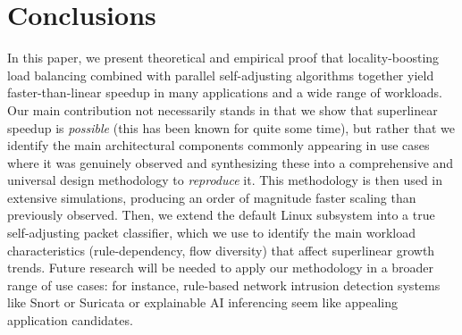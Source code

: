 \section{Conclusions}\label{sec:conclusions}

In this paper, we present theoretical and empirical proof that locality-boosting load balancing combined with parallel self-adjusting algorithms together yield faster-than-linear speedup in many applications and a wide range of workloads. Our main contribution not necessarily stands in that we show that superlinear speedup is \emph{possible} (this has been known for quite some time), but rather that we identify the main architectural components commonly appearing in use cases where it was genuinely observed and synthesizing these into a comprehensive and universal design methodology to \emph{reproduce} it. This methodology is then used in extensive simulations, producing an order of magnitude faster scaling than previously observed. Then, we extend the default \nftables Linux subsystem into a true self-adjusting packet classifier, which we use to identify the main workload characteristics (rule-dependency, flow diversity) that affect superlinear growth trends.  Future research will be needed to apply our methodology in a broader range of use cases: for instance, rule-based network intrusion detection systems like Snort or Suricata \cite{10.5555/2537857.2537883} or explainable AI inferencing seem like appealing application candidates.


